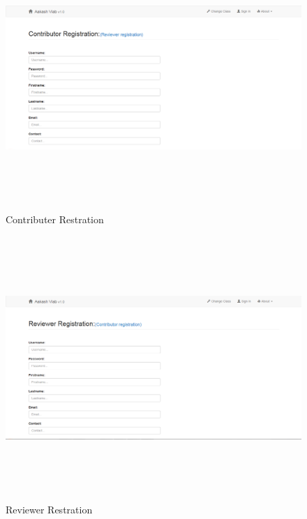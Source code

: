 \documentclass[12pt]{report}
\begin{document}
\begin{figure}[H]
 \centering 
 \includegraphics[width=15cm, height=10cm]{./319.jpg}
 \caption{Contributer Restration\label{fig:319}}
\end{figure}
\begin{figure}[H]
 \centering 
 \includegraphics[width=15cm, height=10cm]{./320.jpg}
 \caption{Reviewer Restration\label{fig:320}}
\end{figure}
\end{document}
